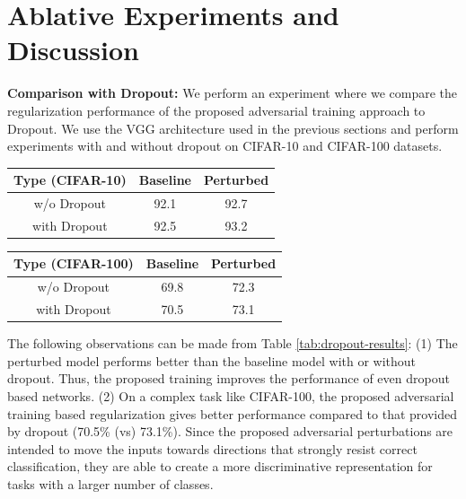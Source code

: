 \documentclass[letterpaper]{article} %
\begin{document}
\section{Ablative Experiments and Discussion}

\textbf{Comparison with Dropout:} We perform an experiment where we compare the regularization performance of the proposed adversarial training approach to Dropout. We use the VGG architecture used in the previous sections and perform experiments with and without dropout on CIFAR-10 and CIFAR-100 datasets.

\begin{center}
\label{tab:dropout-results}
 \begin{tabular}{||c | c | c ||}
 \hline
 Type (CIFAR-10) & Baseline & Perturbed \\ [0.5ex]
 \hline
 w/o Dropout & 92.1 & 92.7  \\
 \hline
 with Dropout & 92.5 & 93.2 \\
 \hline
\end{tabular}
\quad
\begin{tabular}{||c | c | c ||}
 \hline
 Type (CIFAR-100) & Baseline & Perturbed \\ [0.5ex]
 \hline
 w/o Dropout & 69.8 & 72.3  \\
 \hline
 with Dropout & 70.5 & 73.1 \\
 \hline
\end{tabular}
\end{center}

The following observations can be made from Table \ref{tab:dropout-results}: (1) The perturbed model performs better than the baseline model with or without dropout. Thus, the proposed training improves the performance of even dropout based networks. (2) On a complex task like CIFAR-100, the proposed adversarial training based regularization gives better performance compared to that provided by dropout (70.5\% (vs) 73.1\%). Since the proposed adversarial perturbations are intended to move the inputs towards directions that strongly resist correct classification, they are able to create a more discriminative representation for tasks with a larger number of classes.
\end{document}
